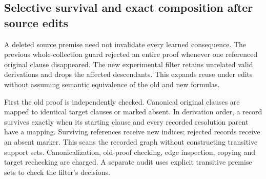 \subsection{Selective survival and exact composition after source edits}
\label{sec:selective-learning}

A deleted source premise need not invalidate every learned consequence.  The
previous whole-collection guard rejected an entire proof whenever one referenced
original clause disappeared.  The new experimental filter retains unrelated
valid derivations and drops the affected descendants.  This expands reuse under
edits without assuming semantic equivalence of the old and new formulas.

First the old proof is independently checked.  Canonical original clauses are
mapped to identical target clauses or marked absent.  In derivation order, a
record survives exactly when its starting clause and every recorded resolution
parent have a mapping.  Surviving references receive new indices; rejected
records receive an absent marker.  This scans the recorded graph without
constructing transitive support sets.  Canonicalization, old-proof checking,
edge inspection, copying and target rechecking are charged.  A separate audit
uses explicit transitive premise sets to check the filter's decisions.

